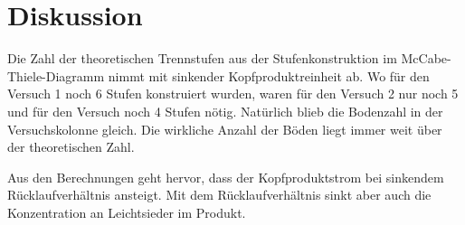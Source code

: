 \newpage
\section{Diskussion}
\label{sec:diskussion}

Die Zahl der theoretischen Trennstufen aus der Stufenkonstruktion im McCabe-Thiele-Diagramm nimmt mit sinkender Kopfproduktreinheit ab. Wo für den Versuch 1 noch 6 Stufen konstruiert wurden, waren für den Versuch 2 nur noch 5 und für den Versuch noch 4 Stufen nötig. Natürlich blieb die Bodenzahl in der Versuchskolonne gleich. Die wirkliche Anzahl der Böden liegt immer weit über der theoretischen Zahl.

Aus den Berechnungen geht hervor, dass der Kopfproduktstrom bei sinkendem Rücklaufverhältnis ansteigt. Mit dem Rücklaufverhältnis sinkt aber auch die Konzentration an Leichtsieder im Produkt.
